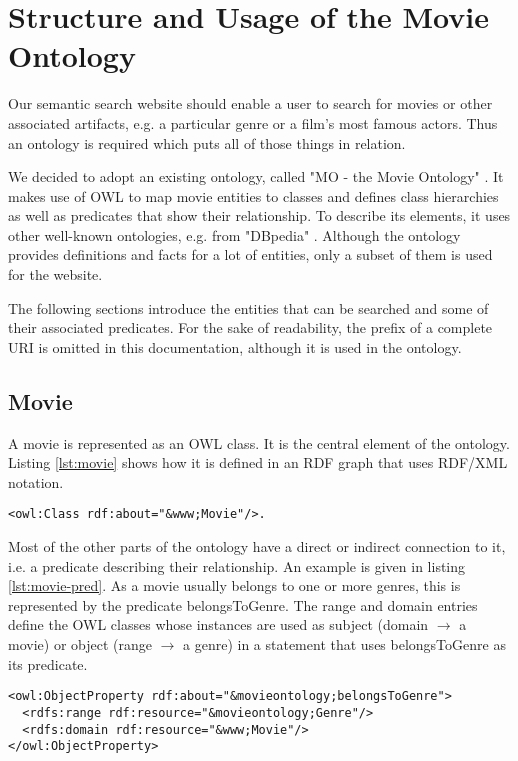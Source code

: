 \section{Structure and Usage of the Movie Ontology}
\label{sec:ontology}
Our semantic search website should enable a user to search for movies or other associated artifacts, e.g. a particular genre or a film's most famous actors. Thus an ontology is required which puts all of those things in relation.

We decided to adopt an existing ontology, called "MO - the Movie Ontology" \cite{bouza:movieontology}. It makes use of OWL to map movie entities to classes and defines class hierarchies as well as predicates that show their relationship. To describe its elements, it uses other well-known ontologies, e.g. from "DBpedia" \cite{dbpedia-swj}. Although the ontology provides definitions and facts for a lot of entities, only a subset of them is used for the website. 

The following sections introduce the entities that can be searched and some of their associated predicates. For the sake of readability, the prefix of a complete URI is omitted in this documentation, although it is used in the ontology.

\subsection{Movie}
A movie is represented as an OWL class. It is the central element of the ontology. Listing \ref{lst:movie} shows how it is defined in an RDF graph that uses RDF/XML notation.

\begin{lstlisting}[caption={OWL Movie Class in RDF/XML notation},label={lst:movie}]
<owl:Class rdf:about="&www;Movie"/>.
\end{lstlisting}

Most of the other parts of the ontology have a direct or indirect connection to it, i.e. a predicate describing their relationship. An example is given in listing \ref{lst:movie-pred}. As a movie usually belongs to one or more genres, this is represented by the predicate belongsToGenre. The range and domain entries define the OWL classes whose instances are used as subject (domain $\rightarrow$ a movie) or object (range $\rightarrow$ a genre) in a statement that uses belongsToGenre as its predicate.

\begin{lstlisting}[caption={Exemplary Movie predicate in RDF/XML notation},label={lst:movie-pred}]
<owl:ObjectProperty rdf:about="&movieontology;belongsToGenre">
  <rdfs:range rdf:resource="&movieontology;Genre"/>
  <rdfs:domain rdf:resource="&www;Movie"/>
</owl:ObjectProperty>
\end{lstlisting}

